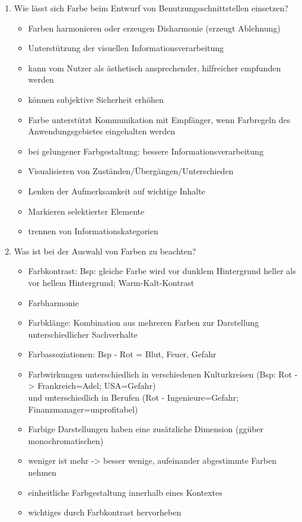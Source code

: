 \begin{enumerate}
	\item Wie lässt sich Farbe beim Entwurf von Benutzungsschnittstellen einsetzen?
	\begin{itemize}
		\item Farben harmonieren oder erzeugen Disharmonie (erzeugt Ablehnung)
		\item Unterstützung der visuellen Informationsverarbeitung
		\item kann vom Nutzer als ästhetisch ansprechender, hilfreicher empfunden werden
		\item können subjektive Sicherheit erhöhen		
		\item Farbe unterstützt Kommunikation mit Empfänger, wenn Farbregeln des Anwendungsgebietes eingehalten werden
		\item bei gelungener Farbgestaltung: bessere Informationsverarbeitung
		\item Visualisieren von Zuständen/Übergängen/Unterschieden
		\item Lenken der Aufmerksamkeit auf wichtige Inhalte
		\item Markieren selektierter Elemente
		\item trennen von Informationskategorien
	\end{itemize}
	
	\item Was ist bei der Auswahl von Farben zu beachten?
	\begin{itemize}
		\item Farbkontrast: Bsp: gleiche Farbe wird vor dunklem Hintergrund heller als vor hellem
		Hintergrund; Warm-Kalt-Kontrast
		\item Farbharmonie
		\item Farbklänge: Kombination aus mehreren Farben zur Darstellung unterschiedlicher Sachverhalte 
		\item Farbassoziationen: Bsp - Rot = Blut, Feuer, Gefahr
		\item Farbwirkungen unterschiedlich in verschiedenen Kulturkreisen (Bsp: Rot -> Frankreich=Adel; USA=Gefahr)\\
		und unterschiedlich in Berufen (Rot - Ingenieure=Gefahr; Finanzmanager=unprofitabel)
		\item Farbige Darstellungen haben eine zusätzliche Dimension (ggüber monochromatischen)
		\item weniger ist mehr -> besser wenige, aufeinander abgestimmte Farben nehmen
		\item einheitliche Farbgestaltung innerhalb eines Kontextes
		\item wichtiges durch Farbkontrast hervorheben
	\end{itemize}
	

\end{enumerate}
